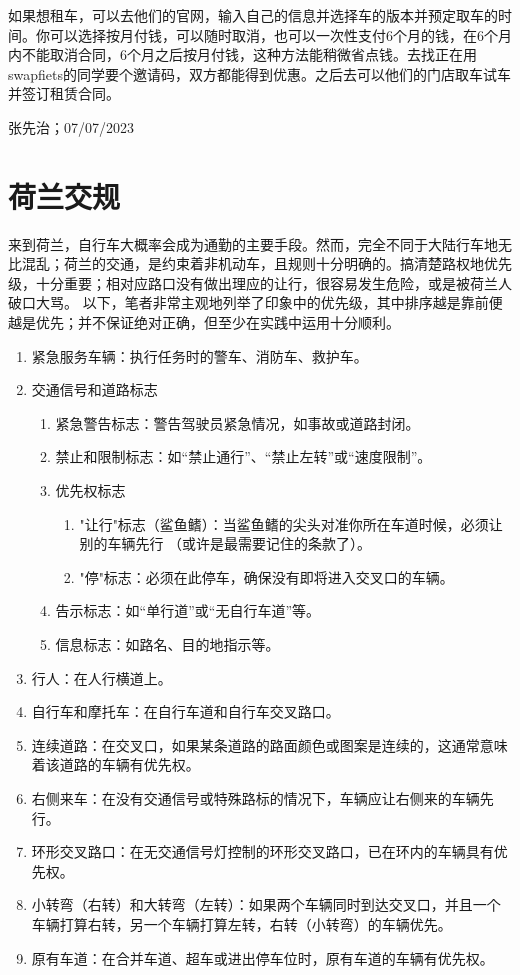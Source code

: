 如果想租车，可以去他们的官网，输入自己的信息并选择车的版本并预定取车的时间。你可以选择按月付钱，可以随时取消，也可以一次性支付6个月的钱，在6个月内不能取消合同，6个月之后按月付钱，这种方法能稍微省点钱。去找正在用swapfiets的同学要个邀请码，双方都能得到优惠。之后去可以他们的门店取车试车并签订租赁合同。
\begin{flushright}
张先治；07/07/2023
\end{flushright}

\vspace{\betsubsec} %
\section{荷兰交规}
来到荷兰，自行车大概率会成为通勤的主要手段。然而，完全不同于大陆行车地无比混乱；荷兰的交通，是约束着非机动车，且规则十分明确的。搞清楚路权地优先级，十分重要；相对应路口没有做出理应的让行，很容易发生危险，或是被荷兰人破口大骂。 以下，笔者非常主观地列举了印象中的优先级，其中排序越是靠前便越是优先；并不保证绝对正确，但至少在实践中运用十分顺利。

\begin{enumerate}
\item 紧急服务车辆：执行任务时的警车、消防车、救护车。
\item 交通信号和道路标志
\begin{enumerate}
    \item 紧急警告标志：警告驾驶员紧急情况，如事故或道路封闭。
    \item 禁止和限制标志：如“禁止通行”、“禁止左转”或“速度限制”。
    \item 优先权标志
    \begin{enumerate}
        \item "让行"标志（鲨鱼鳍）：当鲨鱼鳍的尖头对准你所在车道时候，必须让别的车辆先行 （或许是最需要记住的条款了）。
        \item "停"标志：必须在此停车，确保没有即将进入交叉口的车辆。
    \end{enumerate}
    \item 告示标志：如“单行道”或“无自行车道”等。
    \item 信息标志：如路名、目的地指示等。
\end{enumerate}
\item 行人：在人行横道上。
\item 自行车和摩托车：在自行车道和自行车交叉路口。
\item 连续道路：在交叉口，如果某条道路的路面颜色或图案是连续的，这通常意味着该道路的车辆有优先权。
\item 右侧来车：在没有交通信号或特殊路标的情况下，车辆应让右侧来的车辆先行。
\item 环形交叉路口：在无交通信号灯控制的环形交叉路口，已在环内的车辆具有优先权。
\item 小转弯（右转）和大转弯（左转）：如果两个车辆同时到达交叉口，并且一个车辆打算右转，另一个车辆打算左转，右转（小转弯）的车辆优先。
\item 原有车道：在合并车道、超车或进出停车位时，原有车道的车辆有优先权。
\end{enumerate}

